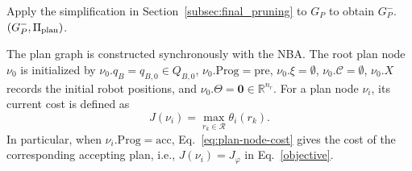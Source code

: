 \documentclass[lettersize,journal]{IEEEtran}
\theoremstyle{italiclemma}
\theoremstyle{italiclemma}
\theoremstyle{definition}
\begin{document}
\begin{algorithm}[t]
\begin{algorithmic}[1]
\ENDWHILE
\STATE Apply the simplification in Section~\ref{subsec:final_pruning}
to $G_P$ to obtain $G_P^{-}$.
\RETURN $(G_P^{-},\Pi_{\rm plan})$.
\end{algorithmic}
\end{algorithm}
The plan graph is constructed synchronously with the NBA. 
The root plan node $\nu_0$ is initialized by
$\nu_0.q_B=q_{B,0}\in Q_{B,0}$,
$\nu_0.\mathrm{Prog}=\mathrm{pre}$,
$\nu_0.\xi=\emptyset$,
$\nu_0.\mathcal C=\emptyset$,
$\nu_0.X$ records the initial robot positions, and
$\nu_0.\Theta=\mathbf{0}\in\mathbb{R}^{n_r}$.
For a plan node $\nu_i$, its current cost is defined as
\begin{equation}
J(\nu_i)=\max_{r_k\in\mathcal R}\theta_i(r_k).
\label{eq:plan-node-cost}
\end{equation}
In particular, when $\nu_i.\mathrm{Prog}=\mathrm{acc}$,
Eq.~\eqref{eq:plan-node-cost} gives the cost of the corresponding accepting plan, i.e., $J(\nu_i)=J_\varphi$ in
Eq.~\eqref{objective}.
\end{document}
